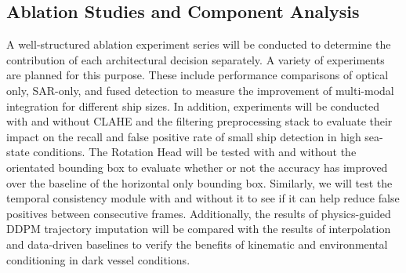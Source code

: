 \subsection{Ablation Studies and Component Analysis}
A well-structured ablation experiment series will be conducted to determine the contribution of each architectural decision separately. A variety of experiments are planned for this purpose. These include performance comparisons of optical only, SAR-only, and fused detection to measure the improvement of multi-modal integration for different ship sizes. In addition, experiments will be conducted with and without CLAHE and the filtering preprocessing stack to evaluate their impact on the recall and false positive rate of small ship detection in high sea-state conditions. The Rotation Head will be tested with and without the orientated bounding box to evaluate whether or not the accuracy has improved over the baseline of the horizontal only bounding box. Similarly, we will test the temporal consistency module with and without it to see if it can help reduce false positives between consecutive frames. Additionally, the results of physics-guided DDPM trajectory imputation will be compared with the results of interpolation and data-driven baselines to verify the benefits of kinematic and environmental conditioning in dark vessel conditions.
 

